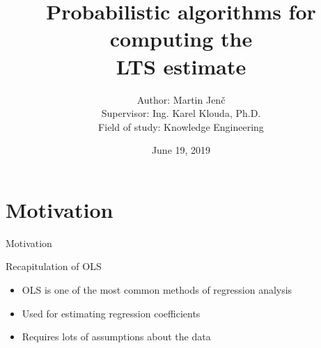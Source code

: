 \documentclass{beamer}
\title[Your Short Title]{Probabilistic algorithms for computing the\\LTS estimate}
\author{Author: Martin Jenč\\
Supervisor: Ing. Karel Klouda, Ph.D.\\
Field of study: Knowledge Engineering}
\date{June 19, 2019}
\begin{document}
\begin{frame}
  \titlepage
\end{frame}




\section{Motivation}
\setcounter{subsection}{1}

\begin{frame}{Motivation}
  \begin{center}
    \vskip 0.5cm
  \end{center}
\end{frame}


\begin{frame}{Recapitulation of OLS}
  \begin{itemize}
   \item OLS is one of the most common methods of regression analysis
   \item Used for estimating regression coefficients
   \item {\color{red} Requires lots of assumptions about the data }
  \end{itemize}
\end{frame}
\end{document}
